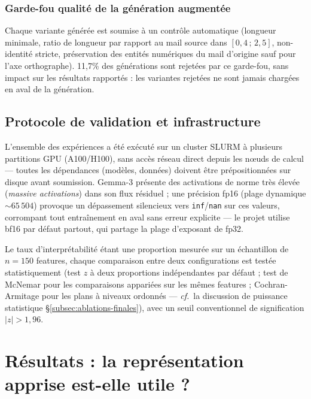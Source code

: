 \documentclass[11pt]{article}
\begin{document}
\subsubsection{Garde-fou qualité de la génération augmentée}
\label{subsec:augmentation}
Chaque variante générée est soumise à un contrôle automatique (longueur
minimale, ratio de longueur par rapport au mail source dans $[0{,}4\,;\,2{,}5]$,
non-identité stricte, préservation des entités numériques du mail d'origine
sauf pour l'axe orthographe). 11,7\% des générations sont rejetées par ce
garde-fou, sans impact sur les résultats rapportés : les variantes rejetées
ne sont jamais chargées en aval de la génération.

\subsection{Protocole de validation et infrastructure}

L'ensemble des expériences a été exécuté sur un cluster SLURM à plusieurs
partitions GPU (A100/H100), sans accès réseau direct depuis les nœuds de
calcul --- toutes les dépendances (modèles, données) doivent être
prépositionnées sur disque avant soumission. Gemma-3 présente des activations
de norme très élevée (\emph{massive activations}) dans son flux résiduel ; une
précision fp16 (plage dynamique $\sim 65\,504$) provoque un dépassement
silencieux vers \texttt{inf}/\texttt{nan} sur ces valeurs, corrompant tout
entraînement en aval sans erreur explicite --- le projet utilise bf16 par
défaut partout, qui partage la plage d'exposant de fp32.

Le taux d'interprétabilité étant une proportion mesurée sur un échantillon de
$n=150$ features, chaque comparaison entre deux configurations est testée
statistiquement (test $z$ à deux proportions indépendantes par défaut ; test de
McNemar pour les comparaisons appariées sur les mêmes features ;
Cochran-Armitage pour les plans à niveaux ordonnés --- \emph{cf.}~la
discussion de puissance statistique \S\ref{subsec:ablations-finales}), avec
un seuil conventionnel de signification $|z| > 1{,}96$.

\newpage
\section{Résultats : la représentation apprise est-elle utile ?}
\label{sec:resultats-representation}
\end{document}
